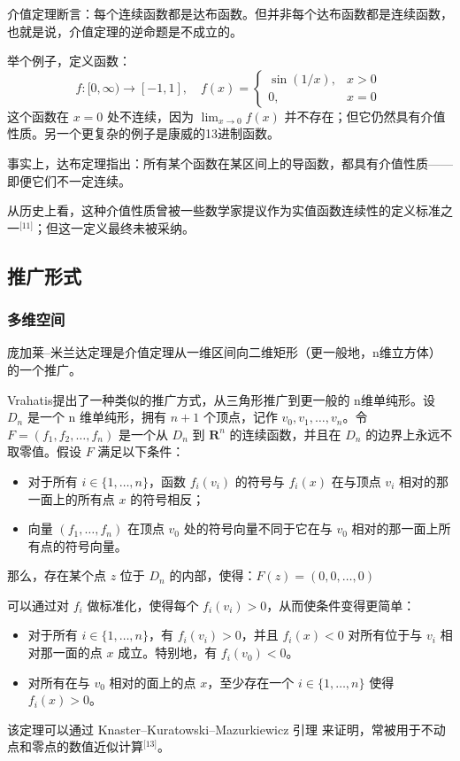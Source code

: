 介值定理断言：每个连续函数都是达布函数。但并非每个达布函数都是连续函数，也就是说，介值定理的逆命题是不成立的。

举个例子，定义函数：
$$
f : [0, \infty) \to [-1, 1], \quad f(x) = \begin{cases}
\sin(1/x), & x > 0 \\
0, & x = 0
\end{cases}~
$$
这个函数在 $x = 0$ 处不连续，因为 $\lim_{x \to 0} f(x)$ 并不存在；但它仍然具有介值性质。另一个更复杂的例子是康威的13进制函数。

事实上，达布定理指出：所有某个函数在某区间上的导函数，都具有介值性质——即便它们不一定连续。

从历史上看，这种介值性质曾被一些数学家提议作为实值函数连续性的定义标准之一\(^\text{[11]}\)；但这一定义最终未被采纳。
\subsection{推广形式}
\subsubsection{多维空间}
庞加莱–米兰达定理是介值定理从一维区间向二维矩形（更一般地，n维立方体）的一个推广。

Vrahatis提出了一种类似的推广方式，从三角形推广到更一般的 n维单纯形。设 $D_n$ 是一个 n 维单纯形，拥有 $n+1$ 个顶点，记作 $v_0, v_1, \dots, v_n$。令 $F = (f_1, f_2, \dots, f_n)$ 是一个从 $D_n$ 到 $\mathbf{R}^n$ 的连续函数，并且在 $D_n$ 的边界上永远不取零值。假设 $F$ 满足以下条件：
\begin{itemize}
\item 对于所有 $i \in \{1, \dots, n\}$，函数 $f_i(v_i)$ 的符号与 $f_i(x)$ 在与顶点 $v_i$ 相对的那一面上的所有点 $x$ 的符号相反；
\item 向量 $(f_1, \dots, f_n)$ 在顶点 $v_0$ 处的符号向量不同于它在与 $v_0$ 相对的那一面上所有点的符号向量。
\end{itemize}
那么，存在某个点 $z$ 位于 $D_n$ 的内部，使得：$F(z) = (0, 0, \dots, 0)$

可以通过对 $f_i$ 做标准化，使得每个 $f_i(v_i) > 0$，从而使条件变得更简单：
\begin{itemize}
\item 对于所有 $i \in \{1, \dots, n\}$，有 $f_i(v_i) > 0$，并且 $f_i(x) < 0$ 对所有位于与 $v_i$ 相对那一面的点 $x$ 成立。特别地，有 $f_i(v_0) < 0$。
\item 对所有在与 $v_0$ 相对的面上的点 $x$，至少存在一个 $i \in \{1, \dots, n\}$ 使得 $f_i(x) > 0$。
\end{itemize}
该定理可以通过 Knaster–Kuratowski–Mazurkiewicz 引理 来证明，常被用于不动点和零点的数值近似计算\(^\text{[13]}\)。
